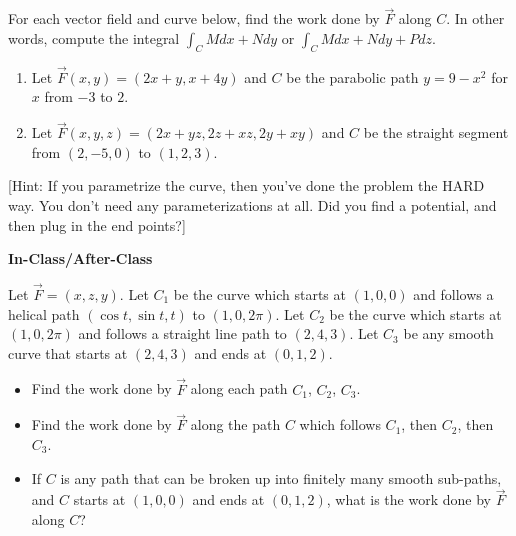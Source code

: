 \begin{problem}
%
For each vector field and curve below, find the work done by $\vec F$ along $C$. In other words, compute the integral $\int_C Mdx+Ndy$ or $\int_C Mdx+Ndy+Pdz$. 
\begin{enumerate}
 \item{}%
 Let $\vec F(x,y) = (2x+y,x+4y)$ and $C$ be the parabolic path $y=9-x^2$ for $x$ from $-3$ to $2$.
 \item{}%
 Let $\vec F(x,y,z) = (2x+yz,2z+xz,2y+xy)$ and $C$ be the straight segment from $(2,-5,0)$ to $(1,2,3)$. 
\end{enumerate}
[Hint: If you parametrize the curve, then you've done the problem the HARD way. You don't need any parameterizations at all. Did you find a potential, and then plug in the end points?]
\end{problem}

\newpage
\large
\textbf{In-Class/After-Class\\}
\normalsize

\begin{problem}%
  Let $\vec F = (x,z,y)$. Let $C_1$ be the curve which starts at $(1,0,0)$ and follows a helical path $(\cos t, \sin t, t)$ to $(1,0,2\pi)$. Let $C_2$ be the curve which starts at $(1,0, 2\pi)$ and follows a straight line path to $(2,4,3)$. Let $C_3$ be any smooth curve that starts at $(2,4,3)$ and ends at $(0,1,2)$.
 \begin{itemize}
  \item Find the work done by $\vec F$ along each path $C_1$, $C_2$, $C_3$. 
  \item Find the work done by $\vec F$ along the path $C$ which follows $C_1$, then $C_2$, then $C_3$.  
  \item If $C$ is any path that can be broken up into finitely many smooth sub-paths, and $C$ starts at $(1,0,0)$ and ends at $(0,1,2)$, what is the work done by $\vec F$ along $C$?
 \end{itemize}
\end{problem}

